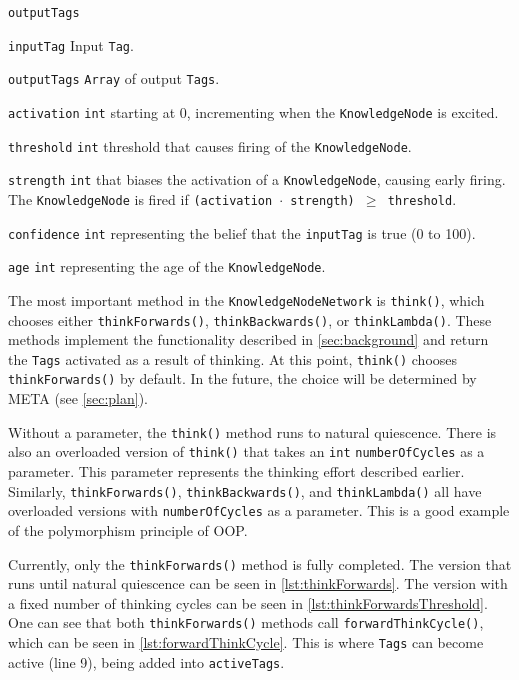 \documentclass[titlepage,11pt]{article}
\newcommand{\ar}[1]{\autoref{#1}}
\newcommand{\code}[1]{\texttt{#1}}
\begin{document}
\begin{labeling}{\code{outputTags}}
	\item[\code{inputTag}] Input \code{Tag}.
	\item[\code{outputTags}] \code{Array} of output \code{Tags}.
	\item[\code{activation}] \code{int} starting at 0, incrementing when the \code{KnowledgeNode} is excited.
	\item[\code{threshold}] \code{int} threshold that causes firing of the \code{KnowledgeNode}.
	\item[\code{strength}] \code{int} that biases the activation of a \code{KnowledgeNode}, causing early firing. The \code{KnowledgeNode} is fired if \code{(activation $\cdot$ strength) $\geq$ threshold}.
	\item[\code{confidence}] \code{int} representing the belief that the \code{inputTag} is true (0 to 100).
	\item[\code{age}] \code{int} representing the age of the \code{KnowledgeNode}.
\end{labeling}

The most important method in the \code{KnowledgeNodeNetwork} is \code{think()}, which chooses either \code{thinkForwards()}, \code{thinkBackwards()}, or \code{thinkLambda()}. These methods implement the functionality described in \ar{sec:background} and return the \code{Tags} activated as a result of thinking. At this point, \code{think()} chooses \code{thinkForwards()} by default. In the future, the choice will be determined by META (see \autoref{sec:plan}).

Without a parameter, the \code{think()} method runs to natural quiescence. There is also an overloaded version of \code{think()} that takes an \code{int} \code{numberOfCycles} as a parameter. This parameter represents the thinking effort described earlier. Similarly, \code{thinkForwards()}, \code{thinkBackwards()}, and \code{thinkLambda()} all have overloaded versions with \code{numberOfCycles} as a parameter. This is a good example of the polymorphism principle of OOP.


Currently, only the \code{thinkForwards()} method is fully completed. The version that runs until natural quiescence can be seen in \autoref{lst:thinkForwards}. The version with a fixed number of thinking cycles can be seen in \autoref{lst:thinkForwardsThreshold}. One can see that both \code{thinkForwards()} methods call \code{forwardThinkCycle()}, which can be seen in \autoref{lst:forwardThinkCycle}. This is where \code{Tags} can become active (line 9), being added into \code{activeTags}.
\end{document}
